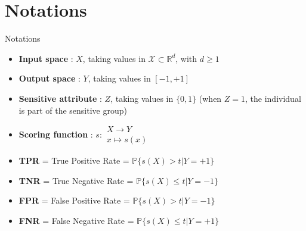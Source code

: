 
\section{Notations}
\begin{frame}{Notations}

    \begin{itemize}
        \item \textbf{Input space} : $X$, taking values in $\mathcal{X} \subset \mathbb{R}^d$, with $d \geq 1$
        \item \textbf{Output space} : $Y$, taking values in $[-1,+1]$ 
        \item \textbf{Sensitive attribute} : $Z$, taking values in $\{0,1\}$ (when $Z=1$, the individual is part of the sensitive group)
        \item \textbf{Scoring function} : $s : \substack{X \rightarrow Y \\ x \mapsto s(x)}$ 
        \item \textbf{TPR} = True Positive Rate = $\mathbb{P} \{s(X) > t | Y = +1 \}$
        \item \textbf{TNR} = True Negative Rate = $\mathbb{P} \{s(X) \leq t | Y = -1 \}$
        \item \textbf{FPR} =  False Positive Rate = $\mathbb{P} \{s(X) > t | Y = -1 \}$
        \item \textbf{FNR} = False Negative Rate = $\mathbb{P} \{s(X) \leq t | Y = +1 \}$
    \end{itemize}
    
\end{frame}


